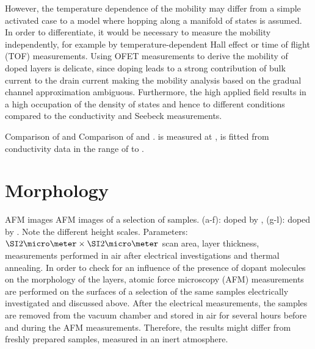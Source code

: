 However, the temperature dependence of the mobility may differ from a simple activated case to a model where hopping along a manifold of states is assumed\cite{Bassler1982, Vissenberg1998}. In order to differentiate, it would be necessary to measure the mobility independently, for example by temperature-dependent Hall effect or time of flight (TOF) measurements. Using OFET measurements to derive the mobility of doped layers is delicate, since doping leads to a strong contribution of bulk current to the drain current making the mobility analysis based on the gradual channel approximation ambiguous. Furthermore, the high applied field results in a high occupation of the density of states and hence to different conditions compared to the conductivity and Seebeck measurements.

{Comparison of \Es and \Eact}
{Comparison of \EsLongL and \EactLongL. \Es is measured at \Tm[40], \Eact is fitted from conductivity data in the range of \T[30] to .}

\section{Morphology}\label{sec:ResPdAFM}
%
%
{AFM images}%
{AFM images of a selection of samples. \mbox{(a-f)}: \CS doped by \CrPd, \mbox{(g-l)}: \CS doped by \WPd. Note the different height scales. Parameters: $\um{2}\times\um{2}$ scan area,  layer thickness, measurements performed in air after electrical investigations and thermal annealing.
}%
%
In order to check for an influence of the presence of dopant molecules on the morphology of the layers, atomic force microscopy (AFM) measurements are performed on the surfaces of a selection of the same samples electrically investigated and discussed above. After the electrical measurements, the samples are removed from the vacuum chamber and stored in air for several hours before and during the AFM measurements.
Therefore, the results might differ from freshly prepared samples, measured in an inert atmosphere.

